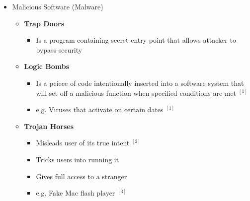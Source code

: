 \documentclass[12pt]{article}
\begin{document}
\begin{itemize}
\begin{itemize}
\begin{itemize}
        \end{itemize}
    \end{itemize}
    \item Malicious Software (Malware)
    \begin{itemize}
        \item \textbf{Trap Doors}
        \begin{itemize}
            \item Is a program containing secret entry point that allows attacker
            to bypass security
        \end{itemize}
        \item \textbf{Logic Bombs}
        \begin{itemize}
            \item Is a peiece of code intentionally inserted into a software system
            that will set off a malicious function when specified conditions are met $^{[1]}$
            \item e.g. Viruses that activate on certain dates $^{[1]}$
        \end{itemize}
        \item \textbf{Trojan Horses}
        \begin{itemize}
            \item Misleads user of its true intent $^{[2]}$
            \item Tricks users into running it
            \item Gives full access to a stranger
            \item e.g. Fake Mac flash player $^{[3]}$
        \end{itemize}


\end{itemize}
\end{itemize}
\end{document}
